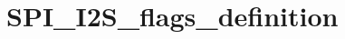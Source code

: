 \hypertarget{group___s_p_i___i2_s__flags__definition}{\section{S\-P\-I\-\_\-\-I2\-S\-\_\-flags\-\_\-definition}
\label{group___s_p_i___i2_s__flags__definition}
}
